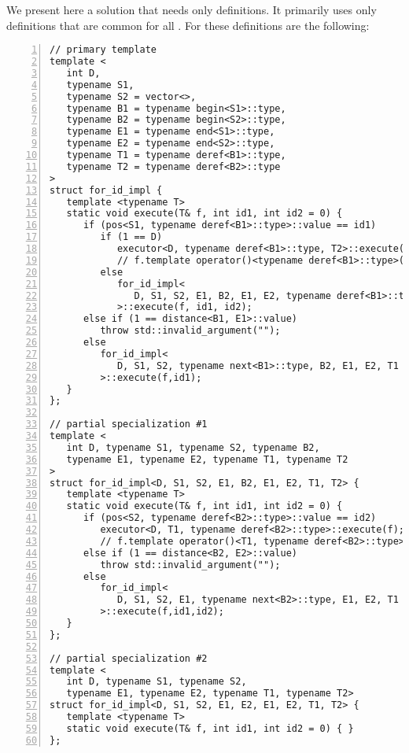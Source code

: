 \documentclass[10pt,a4paper]{article}
\theoremstyle{definition}\newtheorem{problem}{Problem}
\begin{document}
We present here a solution that needs only  definitions. It primarily uses only  definitions that are common for all . For  these definitions are the following: 
{\small
\begin{lstlisting}[numbers=left,xleftmargin=2em]
// primary template
template <
   int D,
   typename S1,
   typename S2 = vector<>,
   typename B1 = typename begin<S1>::type,
   typename B2 = typename begin<S2>::type,
   typename E1 = typename end<S1>::type,
   typename E2 = typename end<S2>::type,
   typename T1 = typename deref<B1>::type,
   typename T2 = typename deref<B2>::type
>
struct for_id_impl {             
   template <typename T>
   static void execute(T& f, int id1, int id2 = 0) {
      if (pos<S1, typename deref<B1>::type>::value == id1)                               
         if (1 == D)                                                              (* \label{lst:opt:condo} *)
            executor<D, typename deref<B1>::type, T2>::execute(f);
            // f.template operator()<typename deref<B1>::type>();                 (* \label{lst:opt:commo} *)
         else
            for_id_impl<
               D, S1, S2, E1, B2, E1, E2, typename deref<B1>::type
            >::execute(f, id1, id2);
      else if (1 == distance<B1, E1>::value)                                      (* \label{lst:opt:condt} *)
         throw std::invalid_argument("");
      else
         for_id_impl<
            D, S1, S2, typename next<B1>::type, B2, E1, E2, T1
         >::execute(f,id1);
   }
};

// partial specialization #1
template <
   int D, typename S1, typename S2, typename B2,
   typename E1, typename E2, typename T1, typename T2
>
struct for_id_impl<D, S1, S2, E1, B2, E1, E2, T1, T2> {                   
   template <typename T>
   static void execute(T& f, int id1, int id2 = 0) {
      if (pos<S2, typename deref<B2>::type>::value == id2)
         executor<D, T1, typename deref<B2>::type>::execute(f);
         // f.template operator()<T1, typename deref<B2>::type>();                (* \label{lst:opt:commt} *)
      else if (1 == distance<B2, E2>::value)                                      (* \label{lst:opt:condh} *)
         throw std::invalid_argument("");
      else
         for_id_impl<
            D, S1, S2, E1, typename next<B2>::type, E1, E2, T1
         >::execute(f,id1,id2);
   }
};

// partial specialization #2
template <
   int D, typename S1, typename S2,
   typename E1, typename E2, typename T1, typename T2>                        
struct for_id_impl<D, S1, S2, E1, E2, E1, E2, T1, T2> {
   template <typename T>
   static void execute(T& f, int id1, int id2 = 0) { }
};
\end{lstlisting}
}
\end{document}
